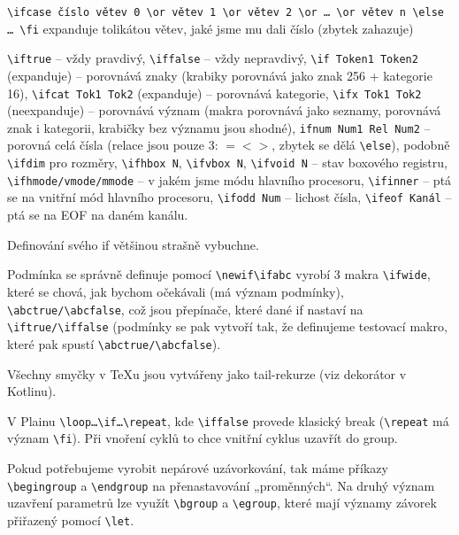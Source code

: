 \documentclass[12pt]{article}					%
\begin{document}
    \begin{definice}[ifcase]
        \verb|\ifcase číslo větev 0 \or větev 1 \or větev 2 \or … \or větev n \else … \fi| expanduje tolikátou větev, jaké jsme mu dali číslo (zbytek zahazuje)
    \end{definice}

    \begin{definice}
        \verb|\iftrue| -- vždy pravdivý, \verb|\iffalse| -- vždy nepravdivý, \verb|\if Token1 Token2| (expanduje) -- porovnává znaky (krabiky porovnává jako znak 256 + kategorie 16), \verb|\ifcat Tok1 Tok2| (expanduje) -- porovnává kategorie, \verb|\ifx Tok1 Tok2| (neexpanduje) -- porovnává význam (makra porovnává jako seznamy, porovnává znak i kategorii, krabičky bez významu jsou shodné), \verb|ifnum Num1 Rel Num2| -- porovná celá čísla (relace jsou pouze 3: $= < >$, zbytek se dělá \verb|\else|), podobně \verb|\ifdim| pro rozměry, \verb|\ifhbox N|, \verb|\ifvbox N|, \verb|\ifvoid N| -- stav boxového registru, \verb|\ifhmode/vmode/mmode| -- v jakém jsme módu hlavního procesoru, \verb|\ifinner| -- ptá se na vnitřní mód hlavního procesoru, \verb|\ifodd Num| -- lichost čísla, \verb|\ifeof Kanál| -- ptá se na EOF na daném kanálu.
    \end{definice}

    \begin{upozorneni}
        Definování svého if většinou strašně vybuchne.
    \end{upozorneni}

    \begin{poznamka}
        Podmínka se správně definuje pomocí \verb|\newif\ifabc| vyrobí 3 makra \verb|\ifwide|, které se chová, jak bychom očekávali (má význam podmínky), \verb|\abctrue/\abcfalse|, což jsou přepínače, které dané if nastaví na \verb|\iftrue/\iffalse| (podmínky se pak vytvoří tak, že definujeme testovací makro, které pak spustí \verb|\abctrue/\abcfalse|).
    \end{poznamka}

    \begin{definice}[Smyčky]
        Všechny smyčky v \TeX u jsou vytvářeny jako tail-rekurze (viz dekorátor v Kotlinu).

        V Plainu \verb|\loop…\if…\repeat|, kde \verb|\iffalse| provede klasický break (\verb|\repeat| má význam \verb|\fi|). Při vnoření cyklů to chce vnitřní cyklus uzavřít do group.
    \end{definice}

    \begin{poznamka}
        Pokud potřebujeme vyrobit nepárové uzávorkování, tak máme příkazy \verb|\begingroup| a \verb|\endgroup| na přenastavování „proměnných“. Na druhý význam uzavření parametrů lze využít \verb|\bgroup| a \verb|\egroup|, které mají významy závorek přiřazený pomocí \verb|\let|.
    \end{poznamka}
\end{document}
